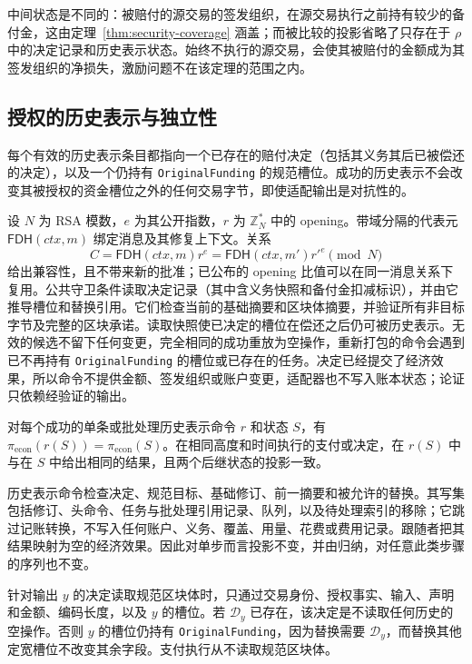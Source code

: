 中间状态是不同的：被赔付的源交易的签发组织，在源交易执行之前持有较少的备付金，这由定理~\ref{thm:security-coverage} 涵盖；而被比较的投影省略了只存在于 $\rho$ 中的决定记录和历史表示状态。始终不执行的源交易，会使其被赔付的金额成为其签发组织的净损失，激励问题不在该定理的范围之内。

\subsection{授权的历史表示与独立性}
\label{sec:security-repair}

\begin{lemma}[由赔付决定把关的历史表示权限]
\label{lem:security-repair}
每个有效的历史表示条目都指向一个已存在的赔付决定（包括其义务其后已被偿还的决定），以及一个仍持有 \texttt{OriginalFunding} 的规范槽位。成功的历史表示不会改变其被授权的资金槽位之外的任何交易字节，即使适配输出是对抗性的。
\end{lemma}
\begin{IEEEproof}
设 $N$ 为 RSA 模数，$e$ 为其公开指数，$r$ 为 $\mathbb Z_N^*$ 中的 opening。带域分隔的代表元 $\mathsf{FDH}(ctx,m)$ 绑定消息及其修复上下文。关系
\begin{equation}
 C=\mathsf{FDH}(ctx,m)r^e=\mathsf{FDH}(ctx,m')r'^e\pmod N
\end{equation}
给出兼容性，且不带来新的批准；已公布的 opening 比值可以在同一消息关系下复用。公共守卫条件读取决定记录（其中含义务快照和备付金扣减标识），并由它推导槽位和替换引用。它们检查当前的基础摘要和区块体摘要，并验证所有非目标字节及完整的区块承诺。读取快照使已决定的槽位在偿还之后仍可被历史表示。无效的候选不留下任何变更，完全相同的成功重放为空操作，重新打包的命令会遇到已不再持有 \texttt{OriginalFunding} 的槽位或已存在的任务。决定已经提交了经济效果，所以命令不提供金额、签发组织或账户变更，适配器也不写入账本状态；论证只依赖经验证的输出。
\end{IEEEproof}

\begin{lemma}[历史表示在经济上是惰性的]
\label{lem:security-representation}
对每个成功的单条或批处理历史表示命令 $r$ 和状态 $S$，有 $\pi_{\mathrm{econ}}(r(S))=\pi_{\mathrm{econ}}(S)$。在相同高度和时间执行的支付或决定，在 $r(S)$ 中与在 $S$ 中给出相同的结果，且两个后继状态的投影一致。
\end{lemma}
\begin{IEEEproof}
历史表示命令检查决定、规范目标、基础修订、前一摘要和被允许的替换。其写集包括修订、头命令、任务与批处理引用记录、队列，以及待处理索引的移除；它跳过记账转换，不写入任何账户、义务、覆盖、用量、花费或费用记录。跟随者把其结果映射为空的经济效果。因此对单步而言投影不变，并由归纳，对任意此类步骤的序列也不变。

针对输出 $y$ 的决定读取规范区块体时，只通过交易身份、授权事实、输入、声明和金额、编码长度，以及 $y$ 的槽位。若 $\mathcal D_y$ 已存在，该决定是不读取任何历史的空操作。否则 $y$ 的槽位仍持有 \texttt{OriginalFunding}，因为替换需要 $\mathcal D_y$，而替换其他定宽槽位不改变其余字段。支付执行从不读取规范区块体。
\end{IEEEproof}

